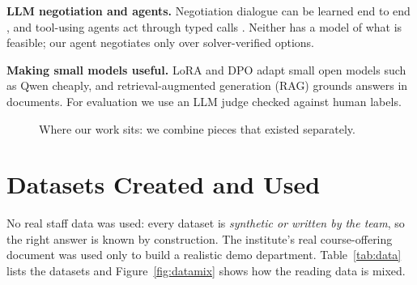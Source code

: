 \documentclass[10pt,a4paper]{article}
\newcommand{\no}{{\color{badred}\textbf{not supported}}}
\begin{document}
\textbf{LLM negotiation and agents.} Negotiation dialogue can be learned end to
end \citep{lewis2017deal}, and tool-using agents act through typed calls
\citep{yao2023react}. Neither has a model of what is feasible; our agent negotiates
only over solver-verified options.

\textbf{Making small models useful.} LoRA \citep{hu2022lora} and DPO
\citep{rafailov2023dpo} adapt small open models such as Qwen \citep{qwen3} cheaply,
and retrieval-augmented generation (RAG) \citep{lewis2020rag} grounds answers in
documents. For evaluation we use an LLM judge \citep{zheng2023judging} checked
against human labels.

\begin{figure}[H]
\centering
{}
\caption{Where our work sits: we combine pieces that existed separately.}
\label{fig:lit}
\end{figure}

\section{Datasets Created and Used}
No real staff data was used: every dataset is \emph{synthetic or written by
the team}, so the right answer is known by construction. The institute's
real course-offering document was used only to build a realistic demo
department. Table~\ref{tab:data} lists the datasets and Figure~\ref{fig:datamix}
shows how the reading data is mixed.
\end{document}
